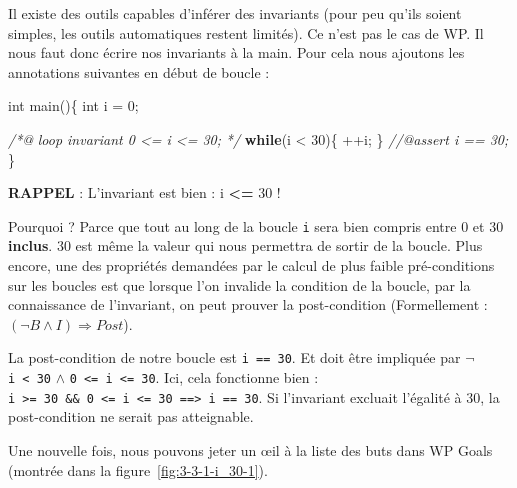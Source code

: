 \documentclass[12pt,francais,]{scrbook}
\newenvironment{Shaded}{}{}
\newcommand{\KeywordTok}[1]{\textcolor[rgb]{0.00,0.44,0.13}{\textbf{{#1}}}}
\newcommand{\DataTypeTok}[1]{\textcolor[rgb]{0.56,0.13,0.00}{{#1}}}
\newcommand{\DecValTok}[1]{\textcolor[rgb]{0.25,0.63,0.44}{{#1}}}
\newcommand{\CommentTok}[1]{\textcolor[rgb]{0.38,0.63,0.69}{\textit{{#1}}}}
\newcommand{\NormalTok}[1]{{#1}}
\newenvironment{zdsalertblock}[1]{%
  \tcolorbox[beamer,%
    noparskip,breakable,
    colback=LightCoral,colframe=DarkRed,%
    colbacklower=Tomato,%
    title=#1]
}{\endtcolorbox}
\begin{document}
Il existe des outils capables d'inférer des invariants (pour peu qu'ils
soient simples, les outils automatiques restent limités). Ce n'est pas
le cas de WP. Il nous faut donc écrire nos invariants à la main. Pour
cela nous ajoutons les annotations suivantes en début de boucle :

\begin{footnotesize}\begin{Shaded}
\begin{Highlighting}[]
\DataTypeTok{int} \NormalTok{main()\{}
  \DataTypeTok{int} \NormalTok{i = }\DecValTok{0}\NormalTok{;}
  
  \CommentTok{/*@}
\CommentTok{    loop invariant 0 <= i <= 30;}
\CommentTok{  */}
  \KeywordTok{while}\NormalTok{(i < }\DecValTok{30}\NormalTok{)\{}
    \NormalTok{++i;}
  \NormalTok{\}}
  \CommentTok{//@assert i == 30;}
\NormalTok{\}}
\end{Highlighting}
\end{Shaded}\end{footnotesize}

\begin{zdsalertblock}{Attention}
  \textbf{RAPPEL} : L'invariant est bien : i \textbf{\textless{}=} 30 !
\end{zdsalertblock}

Pourquoi ? Parce que tout au long de la boucle \texttt{i} sera bien
compris entre 0 et 30 \textbf{inclus}. 30 est même la valeur qui nous
permettra de sortir de la boucle. Plus encore, une des propriétés
demandées par le calcul de plus faible pré-conditions sur les boucles
est que lorsque l'on invalide la condition de la boucle, par la
connaissance de l'invariant, on peut prouver la post-condition
(Formellement : \((\neg B \wedge I) \Rightarrow Post\)).

La post-condition de notre boucle est \texttt{i\ ==\ 30}. Et doit être
impliquée par \(\neg\) \texttt{i\ \textless{}\ 30} \(\wedge\)
\texttt{0\ \textless{}=\ i\ \textless{}=\ 30}. Ici, cela fonctionne bien
:
\texttt{i\ \textgreater{}=\ 30\ \&\&\ 0\ \textless{}=\ i\ \textless{}=\ 30\ ==\textgreater{}\ i\ ==\ 30}.
Si l'invariant excluait l'égalité à 30, la post-condition ne serait pas
atteignable.

Une nouvelle fois, nous pouvons jeter un œil à la liste des buts dans WP
Goals (montrée dans la figure~\ref{fig:3-3-1-i_30-1}).
\end{document}
